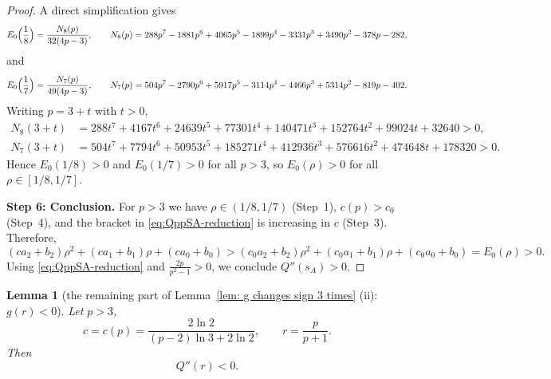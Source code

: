\documentclass[11pt]{article}
\newtheorem{lemma}[theorem]{Lemma}
\theoremstyle{definition}
\newcommand{\1}{\mathbf{1}}
\begin{document}
\begin{proof}
A direct simplification gives
\[
E_0\Bigl(\frac18\Bigr)=\frac{N_8(p)}{32(4p-3)},
\qquad
N_8(p)=288p^7-1881p^6+4065p^5-1899p^4-3331p^3+3490p^2-378p-282,
\]
and
\[
E_0\Bigl(\frac17\Bigr)=\frac{N_7(p)}{49(4p-3)},
\qquad
N_7(p)=504p^7-2790p^6+5917p^5-3114p^4-4466p^3+5314p^2-819p-402.
\]
Writing $p=3+t$ with $t>0$,
\begin{align*}
N_8(3+t)&=288t^7+4167t^6+24639t^5+77301t^4+140471t^3+152764t^2+99024t+32640>0,\\
N_7(3+t)&=504t^7+7794t^6+50953t^5+185271t^4+412936t^3+576616t^2+474648t+178320>0.
\end{align*}
Hence $E_0(1/8)>0$ and $E_0(1/7)>0$ for all $p>3$, so $E_0(\rho)>0$ for all $\rho\in[1/8,1/7]$.

\medskip
\noindent\textbf{Step 6: Conclusion.}
For $p>3$ we have $\rho\in(1/8,1/7)$ (Step~1), $c(p)>c_0$ (Step~4), and the bracket in
\eqref{eq:QppSA-reduction} is increasing in $c$ (Step~3). Therefore,
\[
(ca_2+b_2)\rho^2+(ca_1+b_1)\rho+(ca_0+b_0)
>
(c_0a_2+b_2)\rho^2+(c_0a_1+b_1)\rho+(c_0a_0+b_0)
=E_0(\rho)>0.
\]
Using \eqref{eq:QppSA-reduction} and $\frac{2p}{p^2-1}>0$, we conclude $Q''(s_A)>0$.
\end{proof}


\begin{lemma}[the remaining part of Lemma~\ref{lem: g changes sign 3 times} (ii): $g(r)<0$]\label{lem:Qpp-r-negative}
Let $p>3$,
\[
c=c(p)=\frac{2\ln 2}{(p-2)\ln 3+2\ln 2},
\qquad
r=\frac{p}{p+1}.
\]
Then
\[
Q''(r)<0.
\]
\end{lemma}
\end{document}
